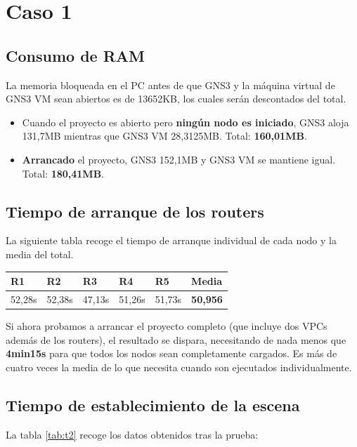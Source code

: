 \section{Caso 1}
\subsection{Consumo de RAM}
La memoria bloqueada en el PC antes de que GNS3 y la máquina virtual de GNS3 VM sean abiertos es de 13652KB, los cuales serán descontados del total.

\begin{itemize}
\item Cuando el proyecto es abierto pero \textbf{ningún nodo es iniciado}, GNS3 aloja 131,7MB mientras que GNS3 VM 28,3125MB. Total: \textbf{160,01MB}.
\item \textbf{Arrancado} el proyecto, GNS3 152,1MB y GNS3 VM se mantiene igual. Total: \textbf{180,41MB}.
\end{itemize}

\subsection{Tiempo de arranque de los routers}
La siguiente tabla recoge el tiempo de arranque individual de cada nodo y la media del total.

\begin{table}[H]
\centering
\begin{tabular}{|l|l|l|l|l|l|}
\hline
\textbf{R1} & \textbf{R2} 	& \textbf{R3} 	& \textbf{R4} 	& \textbf{R5} 	& \textbf{Media}	\\ \hline
52,28s		& 52,38s		& 47,13s		& 51,26s		& 51,73s		& \textbf{50,956}	\\ \hline
\end{tabular}
\label{tab:t1}
\end{table}

Si ahora probamos a arrancar el proyecto completo (que incluye dos VPCs además de los routers), el resultado se dispara, necesitando de nada menos que \textbf{4min15s} para que todos los nodos sean completamente cargados. Es más de cuatro veces la media de lo que necesita cuando son ejecutados individualmente.

\subsection{Tiempo de establecimiento de la escena}
La tabla \ref{tab:t2} recoge los datos obtenidos tras la prueba:

